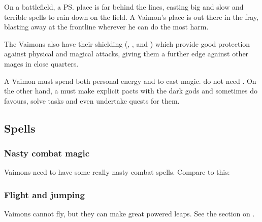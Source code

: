 On a battlefield, a \rethyactic{} \ps{\ishrah} place is far behind the lines, casting big and slow and terrible spells to rain down on the field. 
A Vaimon's place is out there in the fray, blasting away at the frontline wherever he can do the most harm. 

The Vaimons also have their shielding \sephiroth{} (\Barion, \Hoshied, \Teshiron{} and \Yeziel) which provide good protection against physical and magical attacks, giving them a further edge against other mages in close quarters. 

A Vaimon must spend both personal energy and \shechinah{} to cast magic. 
\Rethyaxes{} do not need \shechinah. 
On the other hand, a \rethyax{} must make explicit pacts with the dark gods and sometimes do favours, solve tasks and even undertake quests for them. 









\subsection{Spells}





\subsubsection{Nasty combat magic}
Vaimons need to have some really nasty combat spells. 
Compare to this:






\subsubsection{Flight and jumping}
Vaimons cannot fly, but they can make great powered leaps.
See the section on . 









